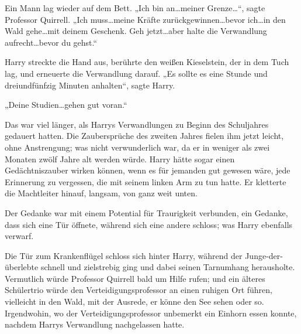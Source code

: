 Ein Mann lag wieder auf dem Bett.
„Ich bin an…meiner Grenze…“, sagte Professor Quirrell. „Ich muss…meine Kräfte zurückgewinnen…bevor ich…in den Wald gehe…mit deinem Geschenk. Geh jetzt…aber halte die Verwandlung aufrecht…bevor du gehst.“

Harry streckte die Hand aus, berührte den weißen Kieselstein, der in dem Tuch lag, und erneuerte die Verwandlung darauf.
„Es sollte es eine Stunde und dreiundfünfzig Minuten anhalten“, sagte Harry.

„Deine Studien…gehen gut voran.“

Das war viel länger, als Harrys Verwandlungen zu Beginn des Schuljahres gedauert hatten. Die Zaubersprüche des zweiten Jahres fielen ihm jetzt leicht, ohne Anstrengung; was nicht verwunderlich war, da er in weniger als zwei Monaten zwölf Jahre alt werden würde. Harry hätte sogar einen Gedächtniszauber wirken können, wenn es für jemanden gut gewesen wäre, jede Erinnerung zu vergessen, die mit seinem linken Arm zu tun hatte.
Er kletterte die Machtleiter hinauf, langsam, von ganz weit unten.

Der Gedanke war mit einem Potential für Traurigkeit verbunden, ein Gedanke, dass sich eine Tür öffnete, während sich eine andere schloss; was Harry ebenfalls verwarf.

\later

Die Tür zum Krankenflügel schloss sich hinter Harry, während der Junge-der-überlebte schnell und zielstrebig ging und dabei seinen Tarnumhang herausholte.
Vermutlich würde Professor Quirrell bald um Hilfe rufen; und ein älteres Schülertrio würde den Verteidigungsprofessor an einen ruhigen Ort führen, vielleicht in den Wald, mit der Ausrede, er könne den See sehen oder so. Irgendwohin, wo der Verteidigungsprofessor unbemerkt ein Einhorn essen konnte, nachdem Harrys Verwandlung nachgelassen hatte.

